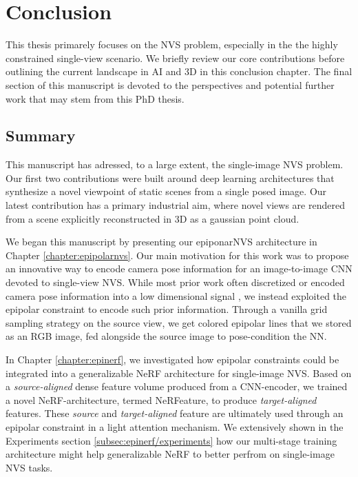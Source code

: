 \chapter{Conclusion}
\label{chapter:conclusion}

{}


This thesis primarely focuses on the \ac{NVS} problem, especially in the the highly constrained single-view scenario. We briefly review our core contributions before outlining the current landscape in \ac{AI} and 3D in this conclusion chapter. The final section of this manuscript is devoted to the perspectives and potential further work that may stem from this PhD thesis.  

\section{Summary}

This manuscript has adressed, to a large extent, the single-image \ac{NVS} problem. Our first two contributions were built around deep learning architectures that synthesize a novel viewpoint of static scenes from a single posed image. Our latest contribution has a primary industrial aim, where novel views are rendered from a scene explicitly reconstructed in 3D as a gaussian point cloud.

We began this manuscript by presenting our epiponarNVS architecture in Chapter \ref{chapter:epipolarnvs}. Our main motivation for this work was to propose an innovative way to encode camera pose information for an image-to-image \ac{CNN} devoted to single-view \ac{NVS}. While most prior work often discretized \citep{kim2020novel} or encoded camera pose information into a low dimensional signal \citep{sun2018multiview}, we instead exploited the epipolar constraint to encode such prior information. Through a vanilla grid sampling strategy on the source view, we get colored epipolar lines that we stored as an RGB image, fed alongside the source image to pose-condition the \ac{NN}. 

In Chapter \ref{chapter:epinerf}, we investigated how epipolar constraints could be integrated into a generalizable \ac{NeRF} architecture for single-image \ac{NVS}. Based on a \textit{source-aligned} dense feature volume produced from a \ac{CNN}-encoder, we trained a novel \ac{NeRF}-architecture, termed NeRFeature, to produce \textit{target-aligned} features. These \textit{source} and \textit{target-aligned} feature are ultimately used through an epipolar constraint in a light attention mechanism. We extensively shown in the Experiments section \ref{subsec:epinerf/experiments} how our multi-stage training architecture might help generalizable \ac{NeRF} to better perfrom on single-image \ac{NVS} tasks.  

